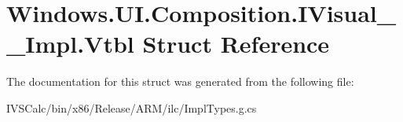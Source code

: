 \hypertarget{struct_windows_1_1_u_i_1_1_composition_1_1_i_visual_____impl_1_1_vtbl}{}\section{Windows.\+U\+I.\+Composition.\+I\+Visual\+\_\+\+\_\+\+Impl.\+Vtbl Struct Reference}
\label{struct_windows_1_1_u_i_1_1_composition_1_1_i_visual_____impl_1_1_vtbl}


The documentation for this struct was generated from the following file\+:\begin{DoxyCompactItemize}
\item 
I\+V\+S\+Calc/bin/x86/\+Release/\+A\+R\+M/ilc/Impl\+Types.\+g.\+cs\end{DoxyCompactItemize}
